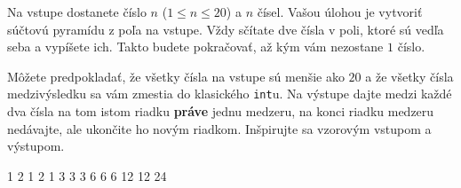 




Na vstupe dostanete číslo $n$ ($1\leq n \leq 20$) a $n$ čísel. Vašou úlohou je vytvoriť súčtovú
pyramídu z poľa na vstupe. Vždy sčítate dve čísla v poli, ktoré sú vedľa seba a vypíšete ich. Takto budete
pokračovať, až kým vám nezostane $1$ číslo.

Môžete predpokladať, že všetky čísla na vstupe sú menšie ako $20$ a že všetky čísla medzivýsledku sa
vám zmestia do klasického \texttt{int}u. Na výstupe dajte medzi každé dva čísla na tom istom riadku
\textbf{práve} jednu medzeru, na konci riadku medzeru nedávajte, ale ukončite ho novým riadkom.
Inšpirujte sa vzorovým vstupom a výstupom.

1 2 1 2 1
 3 3 3
6 6 6
12 12
24
\koniec


